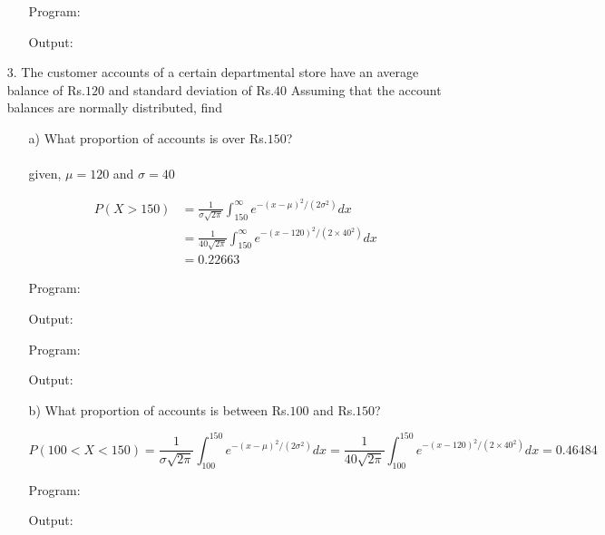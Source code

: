 \documentclass[a4paper,11pt,openright]{report}
\begin{document}
\begin{enumerate}
\begin{enumerate}
Program:

Output:


\end{enumerate}

\vspace{1cm}

\item[3.] The customer accounts of a certain departmental store have an average balance of
Rs.$120$ and standard deviation of Rs.$40$ Assuming that the account balances are normally
distributed, find

\vspace{1cm}

\begin{enumerate}

\item[a)] What proportion of accounts is over Rs.$150$? \\ \\
given, $\mu = 120$ and $\sigma = 40$

\begin{equation*}
\begin{split}
P(X > 150) &= \frac{1}{\sigma\sqrt{2\pi}} \int_{150}^{\infty} e^{-(x-\mu)^2/(2\sigma^{2})} dx \\
		   &= \frac{1}{40\sqrt{2\pi}} \int_{150}^{\infty} e^{-(x-120)^2/(2 \times 40^{2})} dx \\
		   &= 0.22663
\end{split}
\end{equation*}

Program:

Output:


Program:

Output:


\vspace{1cm}

\item[b)] What proportion of accounts is between Rs.$100$ and Rs.$150$?

\begin{equation*}
P(100 < X < 150) = \frac{1}{\sigma\sqrt{2\pi}} \int_{100}^{150} e^{-(x-\mu)^2/(2\sigma^{2})} dx 
		= \frac{1}{40\sqrt{2\pi}} \int_{100}^{150} e^{-(x-120)^2/(2 \times 40^{2})} dx 
		= 0.46484
\end{equation*}

Program:

Output:



\end{enumerate}
\end{enumerate}
\end{document}
